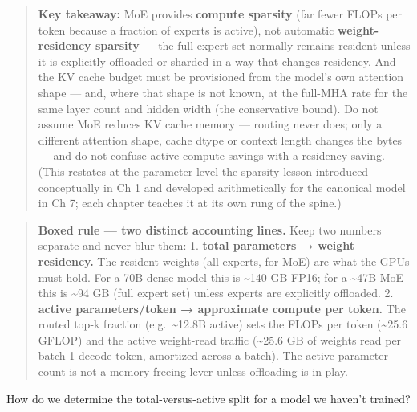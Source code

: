 \begin{quote}
\textbf{Key takeaway:} MoE provides \textbf{compute sparsity} (far fewer
FLOPs per token because a fraction of experts is active), not automatic
\textbf{weight-residency sparsity} --- the full expert set normally
remains resident unless it is explicitly offloaded or sharded in a way
that changes residency. And the KV cache budget must be provisioned from
the model's own attention shape --- and, where that shape is not known,
at the full-MHA rate for the same layer count and hidden width (the
conservative bound). Do not assume MoE reduces KV cache memory ---
routing never does; only a different attention shape, cache dtype or
context length changes the bytes --- and do not confuse active-compute
savings with a residency saving. (This restates at the parameter level
the sparsity lesson introduced conceptually in Ch 1 and developed
arithmetically for the canonical model in Ch 7; each chapter teaches it
at its own rung of the spine.)
\end{quote}

\begin{quote}
\textbf{Boxed rule --- two distinct accounting lines.} Keep two numbers
separate and never blur them: 1. \textbf{total parameters → weight
residency.} The resident weights (all experts, for MoE) are what the
GPUs must hold. For a 70B dense model this is \textasciitilde140 GB
FP16; for a \textasciitilde47B MoE this is \textasciitilde94 GB (full
expert set) unless experts are explicitly offloaded. 2. \textbf{active
parameters/token → approximate compute per token.} The routed top-k
fraction (e.g.~\textasciitilde12.8B active) sets the FLOPs per token
(\textasciitilde25.6 GFLOP) and the active weight-read traffic
(\textasciitilde25.6 GB of weights read per batch-1 decode token,
amortized across a batch). The active-parameter count is not a
memory-freeing lever unless offloading is in play.
\end{quote}

\label{measurement}


How do we determine the total-versus-active split for a model we haven't
trained?

